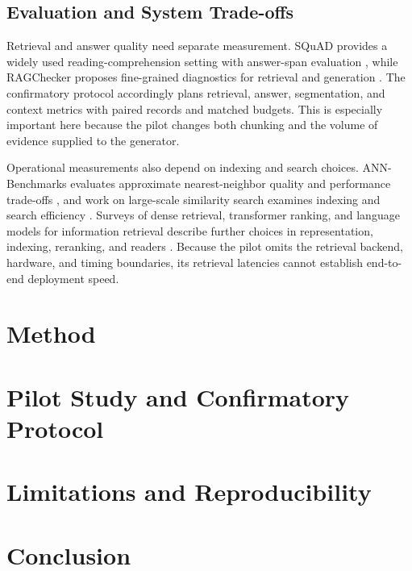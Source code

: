 \documentclass[10pt]{article}
\begin{document}
\subsection{Evaluation and System Trade-offs}

Retrieval and answer quality need separate measurement. SQuAD provides a widely used reading-comprehension setting with answer-span evaluation \cite{Rajpurkar2016Squad100000}, while RAGChecker proposes fine-grained diagnostics for retrieval and generation \cite{Ru2024RagcheckerFinegrained}. The confirmatory protocol accordingly plans retrieval, answer, segmentation, and context metrics with paired records and matched budgets. This is especially important here because the pilot changes both chunking and the volume of evidence supplied to the generator.

Operational measurements also depend on indexing and search choices. ANN-Benchmarks evaluates approximate nearest-neighbor quality and performance trade-offs \cite{Aumller2018AnnbenchmarksBenchmarking}, and work on large-scale similarity search examines indexing and search efficiency \cite{Johnson2017BillionscaleSimilarity}. Surveys of dense retrieval, transformer ranking, and language models for information retrieval describe further choices in representation, indexing, reranking, and readers \cite{Zhao2022DenseText,Yates2020PretrainedTransformers,Zhu2023LargeLanguage}. Because the pilot omits the retrieval backend, hardware, and timing boundaries, its retrieval latencies cannot establish end-to-end deployment speed.

\section{Method}
\section{Pilot Study and Confirmatory Protocol}
\section{Limitations and Reproducibility}
\section{Conclusion}


\end{document}
